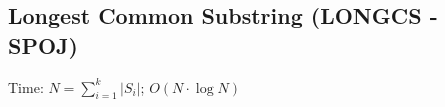 \subsection{Longest Common Substring (LONGCS - SPOJ)}

Time: $N = \sum_{i = 1}^k |S_i|$; $O(N \cdot \log N)$
